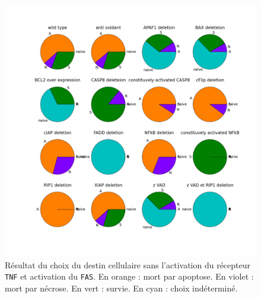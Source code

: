 \documentclass[11pt, a4paper]{article}
\begin{document}
\begin{figure}[position]
    \begin{center}
        \includegraphics[scale=0.25]{tnf0_fas1}
        \caption{
            \label{tnf0_fas1}
            Résultat du choix du destin cellulaire sans l'activation du
            récepteur \texttt{TNF} et activation du \texttt{FAS}. En orange :
            mort par apoptose. En violet : mort par nécrose. En vert : survie.
            En cyan : choix indéterminé.
        }
    \end{center}
\end{figure}
\end{document}
